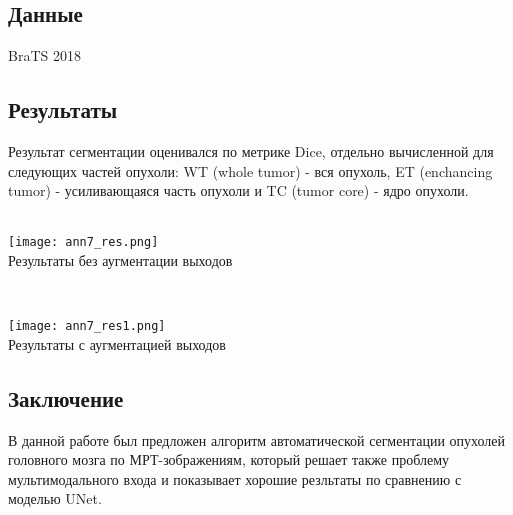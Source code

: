 \subsection*{Данные}
BraTS 2018
\subsection*{Результаты}
Результат сегментации  оценивался по метрике Dice, отдельно вычисленной
для следующих частей опухоли: WT (whole tumor) -  вся опухоль, ET (enchancing tumor) - 
усиливающаяся часть опухоли и TC (tumor core) - ядро опухоли. \\
 \\
\begin{minipage}{1.0\linewidth}
    \begin{center}
        \texttt{[image: ann7\_res.png]} \\
        \caption{\scriptsize{Результаты без аугментации выходов}}
    \end{center}
\end{minipage}
 \\
\begin{minipage}{1.0\linewidth}
    \begin{center}
        \texttt{[image: ann7\_res1.png]} \\
        \caption{\scriptsize{Результаты с аугментацией выходов}}
    \end{center}
\end{minipage}
\subsection*{Заключение}
В данной работе был предложен алгоритм автоматической сегментации 
опухолей головного мозга по МРТ-зображениям, который решает также проблему
мультимодального входа и показывает хорошие резльтаты по сравнению с моделью UNet.


